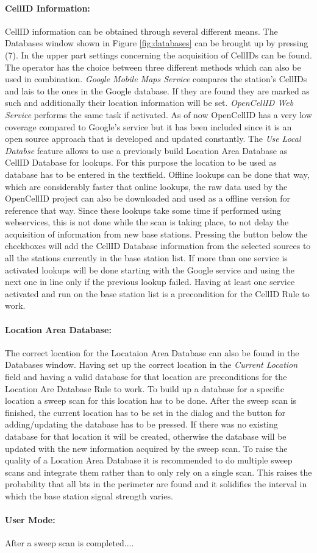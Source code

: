 \paragraph{CellID Information:} CellID information can be obtained through several different means.
The Databases window shown in Figure \ref{fig:databases} can be brought up by pressing (7).
In the upper part settings concerning the acquisition of CellIDs can be found.
The operator has the choice between three different methods which can also be used in combination.
\emph{Google Mobile Maps Service} compares the station's CellIDs and \glspl{lai} to the ones in the Google database.
If they are found they are marked as such and additionally their location information will be set.
\emph{OpenCellID Web Service} performs the same task if activated.
As of now OpenCellID has a very low coverage compared to Google's service but it has been included since it is an open source approach that is developed and updated constantly.
The \emph{Use Local Databse} feature allows to use a previously build Location Area Database as CellID Database for lookups.
For this purpose the location to be used as database has to be entered in the textfield.
Offline lookups can be done that way, which are considerably faster that online lookups, the raw data used by the OpenCellID project can also be downloaded and used as a offline version for reference that way.
Since these lookups take some time if performed using webservices, this is not done while the scan is taking place, to not delay the acquisition of information from new base stations.
Pressing the button below the checkboxes will add the CellID Database information from the selected sources to all the stations currently in the base station list.
If more than one service is activated lookups will be done starting with the Google service and using the next one in line only if the previous lookup failed.
Having at least one service activated and run on the base station list is a precondition for the CellID Rule to work.

\paragraph{Location Area Database:} The correct location for the Locataion Area Database can also be found in the Databases window.
Having set up the correct location in the \emph{Current Location} field and having a valid database for that location are preconditions for the Location Are Database Rule to work.
To build up a database for a specific location a sweep scan for this location has to be done.
After the sweep scan is finished, the current location has to be set in the dialog and the button for adding/updating the database has to be pressed.
If there was no existing database for that location it will be created, otherwise the database will be updated with the new information acquired by the sweep scan.
To raise the quality of a Location Area Database it is recommended to do multiple sweep scans and integrate them rather than to only rely on a single scan.
This raises the probability that all \gls{bts} in the perimeter are found and it solidifies the interval in which the base station signal strength varies.

\paragraph{User Mode:} After a sweep scan is completed....